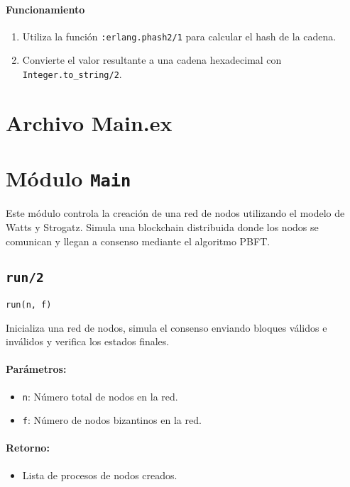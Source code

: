 {\paragraph{Funcionamiento}
\begin{enumerate}
    \item Utiliza la función \texttt{:erlang.phash2/1} para calcular el hash de la cadena.
    \item Convierte el valor resultante a una cadena hexadecimal con \texttt{Integer.to\_string/2}.
\end{enumerate}


\section*{Archivo Main.ex}

\section*{Módulo \texttt{Main}}
Este módulo controla la creación de una red de nodos utilizando el modelo de Watts y Strogatz. Simula una blockchain distribuida donde los nodos se comunican y llegan a consenso mediante el algoritmo PBFT.

\subsection*{\texttt{run/2}}
\begin{verbatim}
run(n, f)
\end{verbatim}

Inicializa una red de nodos, simula el consenso enviando bloques válidos e inválidos y verifica los estados finales.

\paragraph{Parámetros:}
\begin{itemize}
    \item \texttt{n}: Número total de nodos en la red.
    \item \texttt{f}: Número de nodos bizantinos en la red.
\end{itemize}

\paragraph{Retorno:}
\begin{itemize}
    \item Lista de procesos de nodos creados.
\end{itemize}

}
